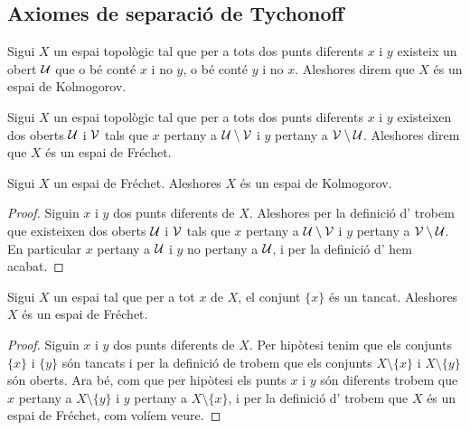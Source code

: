 \documentclass[../Apunts.tex]{subfiles}
\begin{document}
	\subsection{Axiomes de separació de Tychonoff}
	\begin{definition}
		\label{def:espai de Kolmogorov}
		Sigui \(X\) un espai topològic tal que per a tots dos punts diferents \(x\) i \(y\) existeix un obert \(\mathcal{U}\) que o bé conté \(x\) i no \(y\), o bé conté \(y\) i no \(x\). Aleshores direm que \(X\) és un espai de Kolmogorov.
	\end{definition}
	\begin{definition}
		\label{def:espai de Fréchet}
		Sigui \(X\) un espai topològic tal que per a tots dos punts diferents \(x\) i \(y\) existeixen dos oberts \(\mathcal{U}\) i \(\mathcal{V}\) tals que \(x\) pertany a \(\mathcal{U}\setminus\mathcal{V}\) i \(y\) pertany a \(\mathcal{V}\setminus\mathcal{U}\). Aleshores direm que \(X\) és un espai de Fréchet.
	\end{definition}
	\begin{proposition}
		\label{prop:els espais de Fréchet són de Kolmogorov}
		Sigui \(X\) un espai de Fréchet. Aleshores \(X\) és un espai de Kolmogorov.
		\begin{proof}
			Siguin \(x\) i \(y\) dos punts diferents de \(X\). Aleshores per la definició d' trobem que existeixen dos oberts \(\mathcal{U}\) i \(\mathcal{V}\) tals que \(x\) pertany a \(\mathcal{U}\setminus\mathcal{V}\) i \(y\) pertany a \(\mathcal{V}\setminus\mathcal{U}\). En particular \(x\) pertany a \(\mathcal{U}\) i \(y\) no pertany a \(\mathcal{U}\), i per la definició d' hem acabat.
		\end{proof}
	\end{proposition}
	\begin{proposition}
		\label{prop:si en un espai topològic tots els punts són tancats aquest és Fréchet}
		Sigui \(X\) un espai tal que per a tot \(x\) de \(X\), el conjunt \(\{x\}\) és un tancat. Aleshores \(X\) és un espai de Fréchet.
		\begin{proof}
			Siguin \(x\) i \(y\) dos punts diferents de \(X\). Per hipòtesi tenim que els conjunts \(\{x\}\) i \(\{y\}\) són tancats i per la definició de  trobem que els conjunts \(X\setminus\{x\}\) i \(X\setminus\{y\}\) són oberts. Ara bé, com que per hipòtesi els punts \(x\) i \(y\) són diferents trobem que \(x\) pertany a \(X\setminus\{y\}\) i \(y\) pertany a \(X\setminus\{x\}\), i per la definició d' trobem que \(X\) és un espai de Fréchet, com volíem veure.
		\end{proof}
	\end{proposition}
\end{document}
